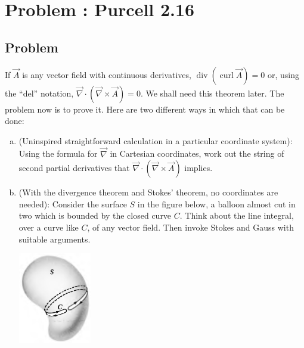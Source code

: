 \documentclass[solutions]{esg8022pset}
\begin{document}
\section{Problem \thesection: Purcell 2.16}
\subsection{Problem}
  If $\vec A$ is any vector field with continuous derivatives, $\operatorname{div}(\operatorname{curl}\vec A) = 0$ or, using the ``del'' notation, $\vec \nabla \cdot (\vec \nabla \times \vec A) = 0$. We shall need this theorem later. The problem now is to prove it. Here are two different ways in which that can be done:
  \begin{enumerate}[(a)]
    \item (Uninspired straightforward calculation in a particular coordinate system): Using the formula for $\vec\nabla$ in Cartesian coordinates, work out the string of second partial derivatives that $\vec \nabla \cdot (\vec \nabla \times \vec A)$ implies.
    \item (With the divergence theorem and Stokes' theorem, no coordinates are needed): Consider the surface $S$ in the figure below, a balloon almost cut in two which is bounded by the closed curve $C$. Think about the line integral, over a curve like $C$, of any vector field. Then invoke Stokes and Gauss with suitable arguments.
      \begin{center}\includegraphics[width=0.25\textwidth]{ps03_02}\end{center}
  \end{enumerate}
\end{document}

